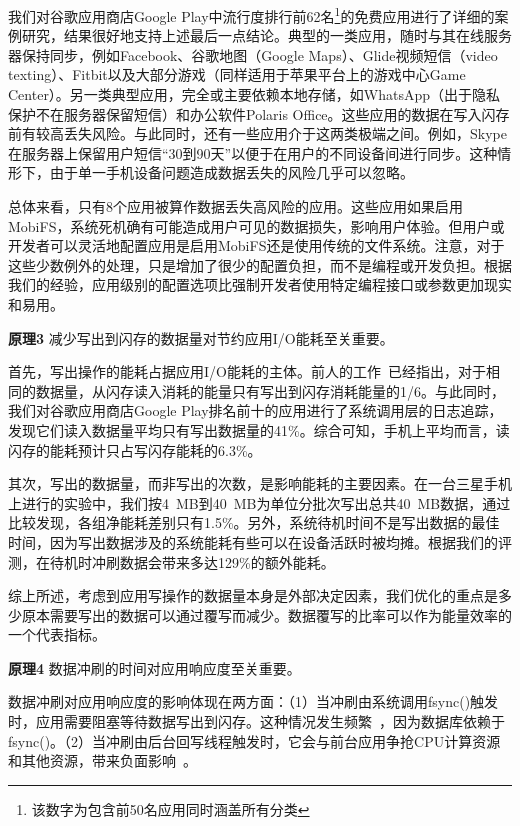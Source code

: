 我们对谷歌应用商店Google Play中流行度排行前62名\footnote{该数字为包含前50名应用同时涵盖所有分类}的免费应用进行了详细的案例研究，结果很好地支持上述最后一点结论。典型的一类应用，随时与其在线服务器保持同步，例如Facebook、谷歌地图（Google Maps）、Glide视频短信（video texting）、Fitbit以及大部分游戏（同样适用于苹果平台上的游戏中心Game Center）。另一类典型应用，完全或主要依赖本地存储，如WhatsApp（出于隐私保护不在服务器保留短信）和办公软件Polaris Office。这些应用的数据在写入闪存前有较高丢失风险。与此同时，还有一些应用介于这两类极端之间。例如，Skype在服务器上保留用户短信“30到90天”以便于在用户的不同设备间进行同步。这种情形下，由于单一手机设备问题造成数据丢失的风险几乎可以忽略。

总体来看，只有8个应用被算作数据丢失高风险的应用。这些应用如果启用MobiFS，系统死机确有可能造成用户可见的数据损失，影响用户体验。但用户或开发者可以灵活地配置应用是启用MobiFS还是使用传统的文件系统。注意，对于这些少数例外的处理，只是增加了很少的配置负担，而不是编程或开发负担。根据我们的经验，应用级别的配置选项比强制开发者使用特定编程接口或参数更加现实和易用。

\textbf{原理3} 减少写出到闪存的数据量对节约应用I/O能耗至关重要。

首先，写出操作的能耗占据应用I/O能耗的主体。前人的工作~\cite{Carroll:2010:APC:1855840.1855861}已经指出，对于相同的数据量，从闪存读入消耗的能量只有写出到闪存消耗能量的1/6。与此同时，我们对谷歌应用商店Google Play排名前十的应用进行了系统调用层的日志追踪，发现它们读入数据量平均只有写出数据量的41\%。综合可知，手机上平均而言，读闪存的能耗预计只占写闪存能耗的6.3\%。

其次，写出的数据量，而非写出的次数，是影响能耗的主要因素。在一台三星手机上进行的实验中，我们按4~MB到40~MB为单位分批次写出总共40~MB数据，通过比较发现，各组净能耗差别只有1.5\%。另外，系统待机时间不是写出数据的最佳时间，因为写出数据涉及的系统能耗有些可以在设备活跃时被均摊。根据我们的评测，在待机时冲刷数据会带来多达129\%的额外能耗。

综上所述，考虑到应用写操作的数据量本身是外部决定因素，我们优化的重点是多少原本需要写出的数据可以通过覆写而减少。数据覆写的比率可以作为能量效率的一个代表指标。

\textbf{原理4} 数据冲刷的时间对应用响应度至关重要。

数据冲刷对应用响应度的影响体现在两方面：（1）当冲刷由系统调用fsync()触发时，应用需要阻塞等待数据写出到闪存。这种情况发生频繁~\cite{Jeong:2013:ISO:2535461.2535499,Lee:2012:SLD:2380356.2380367}，因为数据库依赖于fsync()。（2）当冲刷由后台回写线程触发时，它会与前台应用争抢CPU计算资源和其他资源，带来负面影响~\cite{Kim:RSS:2012, Nguyen:2014:ISR:2638728.2638841}。


